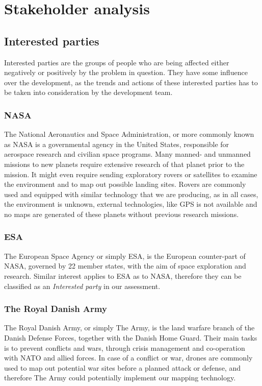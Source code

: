 \clearpage
\section{Stakeholder analysis}
	
\subsection{Interested parties}
Interested parties are the groups of people who are being affected either negatively or positively by the problem in question. They have some influence over the development, as the trends and actions of these interested parties has to be taken into consideration by the development team.

\subsubsection{NASA}
The National Aeronautics and Space Administration, or more commonly known as NASA is a governmental agency in the United States, responsible for aerospace research and civilian space programs. Many manned- and unmanned missions to new planets require extensive research of that planet prior to the mission. It might even require sending exploratory rovers or satellites to examine the environment and to map out possible landing sites. Rovers are commonly used and equipped with similar technology that we are producing, as in all cases, the environment is unknown, external technologies, like GPS is not available and no maps are generated of these planets without previous research missions. 

\subsubsection{ESA}
The European Space Agency or simply ESA, is the European counter-part of NASA, governed by 22 member states, with the aim of space exploration and research. Similar interest applies to ESA as to NASA, therefore they can be classified as an \textit{Interested party} in our assessment.

\subsubsection{The Royal Danish Army}
The Royal Danish Army, or simply The Army, is the land warfare branch of the Danish Defense Forces, together with the Danish Home Guard. Their main tasks is to prevent conflicts and wars, through crisis management and co-operation with NATO and allied forces\cite{armytasks}. In case of a conflict or war, drones are commonly used to map out potential war sites before a planned attack or defense, and therefore The Army could potentially implement our mapping technology.

